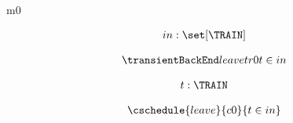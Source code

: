 \documentclass[12pt]{amsart}
\title{}
\author{}
\date{} %
\begin{document}
\maketitle
\tableofcontents


\begin{machine}{m0}

\newset{\TRAIN}

%
	\begin{align*}
	\variable{	in : \set[\TRAIN]}
	\end{align*}
%


\begin{align*}
\transient{leave}{tr0}
{	t \in in	}
\end{align*}

\begin{align*}
\dummy{	t : \TRAIN}
\end{align*}

\begin{align*}
\cschedule{leave}{c0}
{	t \in in	}
\end{align*}

\end{machine}
\end{document}
